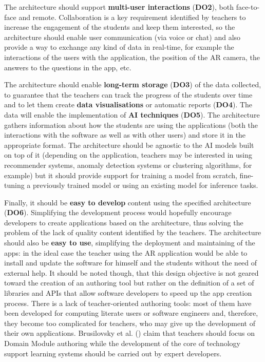 The architecture should support \textbf{multi-user interactions} (\textbf{DO2}), both face-to-face and remote. Collaboration is a key requirement identified by teachers to increase the engagement of the students and keep them interested, so the architecture should enable user communication (via voice or chat) and also provide a way to exchange any kind of data in real-time, for example the interactions of the users with the application, the position of the AR camera, the answers to the questions in the app, etc.

The architecture should enable \textbf{long-term storage} (\textbf{DO3}) of the data collected, to guarantee that the teachers can track the progress of the students over time and to let them create \textbf{data visualisations} or automatic reports (\textbf{DO4}). The data will enable the implementation of \textbf{AI techniques} (\textbf{DO5}). The architecture gathers information about how the students are using the applications (both the interactions with the software as well as with other users) and store it in the appropriate format. The architecture should be agnostic to the AI models built on top of it (depending on the application, teachers may be interested in using recommender systems, anomaly detection systems or clustering algorithms, for example) but it should provide support for training a model from scratch, fine-tuning a previously trained model or using an existing model for inference tasks.

Finally, it should be \textbf{easy to develop} content using the specified architecture (\textbf{DO6}). Simplifying the development process would hopefully encourage developers to create applications based on the architecture, thus solving the problem of the lack of quality content identified by the teachers. The architecture should also be \textbf{easy to use}, simplifying the deployment and maintaining of the apps: in the ideal case the teacher using the AR application would be able to install and update the software for himself and the students without the need of external help. It should be noted though, that this design objective is not geared toward the creation of an authoring tool but rather on the definition of a set of libraries and APIs that allow software developers to speed up the app creation process. There is a lack of teacher-oriented authoring tools: most of them have been developed for computing literate users or software engineers and, therefore, they become too complicated for teachers, who may give up the development of their own applications. Brusilovsky et al. (\citeyear{brusilovsky2003adaptive}) claim that teachers should focus on Domain Module authoring while the development of the core of technology support learning systems should be carried out by expert developers.

